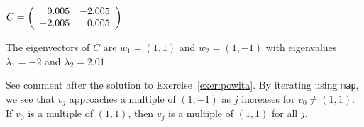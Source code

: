 \documentclass{ximera}
\begin{document}
\begin{exercise}  \label{exer:powitc}
$C=\left(\begin{array}{rr} 0.005 & -2.005\\ -2.005 &0.005\end{array}\right)$

\begin{solution}

\ans The eigenvectors of $C$ are $w_1 = (1,1)$ and $w_2 = (1,-1)$ with 
eigenvalues $\lambda_1 = -2$ and $\lambda_2 = 2.01$.  

\soln See comment after the solution to Exercise~\ref{exer:powita}.
By iterating using {\tt map}, we see that $v_j$ approaches a multiple
of $(1,-1)$ as $j$ increases for $v_0 \neq (1,1)$.  If $v_0$ is a
multiple of $(1,1)$, then $v_j$ is a multiple of $(1,1)$ for all $j$.

\end{solution}
\end{exercise}
\end{document}

